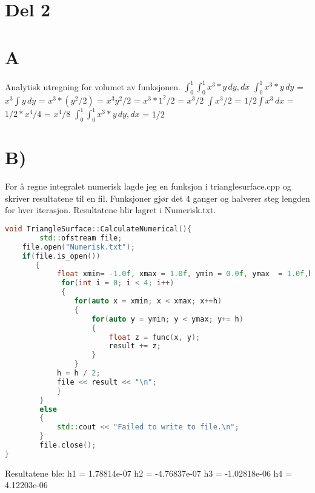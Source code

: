 \documentclass[a4paper,norsk]{article}
\begin{document}
\section{Del 2}
\section{A}
Analytisk utregning for volumet av funksjonen.
\(\int_{0}^{1} \int_{0}^{1} x^3 * y \,dy, dx\)
\newline
\(\int_{0}^{1} x^3*y \,dy\) = \(x^3\int y \,dy\) = \(x^3 * (y^2/2) \) = \( x^3y^2/2  \) = \( x^3*1^2/2\) = \(x^3/2\)
\newline \(\int x^3/2\) = \(1/2 \int x^3\,dx\) = \(1/2* x^4/4\) = \( x^4/8 \)
\newline\(\int_{0}^{1} \int_{0}^{1} x^3 * y \,dy, dx\) = 1/2

\section{B)}
For å regne integralet numerisk lagde jeg en funksjon i trianglesurface.cpp og skriver resultatene til en fil.
Funksjoner gjør det 4 ganger og halverer steg lengden for hver iterasjon. Resultatene blir lagret i Numerisk.txt.
\begin{lstlisting}[language=C++, caption={trianglesurface.cpp}]
void TriangleSurface::CalculateNumerical(){
    	std::ofstream file;
   	file.open("Numerisk.txt");
	if(file.is_open())
       {
        	float xmin= -1.0f, xmax = 1.0f, ymin = 0.0f, ymax  = 1.0f,h = 0.25f, result = 0;
             for(int i = 0; i < 4; i++)
             {
                for(auto x = xmin; x < xmax; x+=h)
                {
                    for(auto y = ymin; y < ymax; y+= h)
                    {
                        float z = func(x, y);
                        result += z;
                    }
                }
            h = h / 2;
            file << result << "\n";
            }
        }
        else
        {
            std::cout << "Failed to write to file.\n";
        }
        file.close();
}
\end{lstlisting}
Resultatene ble:
h1 = 1.78814e-07
h2 = -4.76837e-07
h3 = -1.02818e-06
h4 = 4.12203e-06
\end{document}
